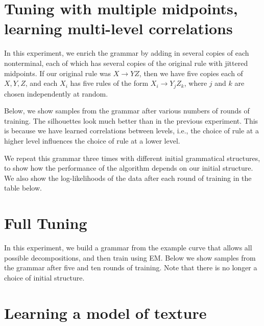 \documentclass{book}
\begin{document}
\section{Tuning with multiple midpoints, learning multi-level correlations}

In this experiment, we enrich the grammar by adding in several copies
of each nonterminal, each of which has several copies of the original
rule with jittered midpoints. If our original rule was $X\to YZ$, then
we have five copies each of $X,Y,Z$, and each $X_i$ has five rules of
the form $X_i \to Y_j Z_k$, where $j$ and $k$ are chosen independently
at random.

Below, we show samples from the grammar after various numbers of
rounds of training. The silhouettes look much better than in the
previous experiment. This is because we have learned correlations
between levels, i.e., the choice of rule at a higher level influences
the choice of rule at a lower level.

We repeat this grammar three times with different initial grammatical
structures, to show how the performance of the algorithm depends on
our initial structure. We also show the log-likelihoods of the data
after each round of training in the table below.



\section{Full Tuning}

In this experiment, we build a grammar from the example curve that
allows all possible decompositions, and then train using EM. Below we
show samples from the grammar after five and ten rounds of
training. Note that there is no longer a choice of initial structure.



% 

\section{Learning a model of texture}
\end{document}
